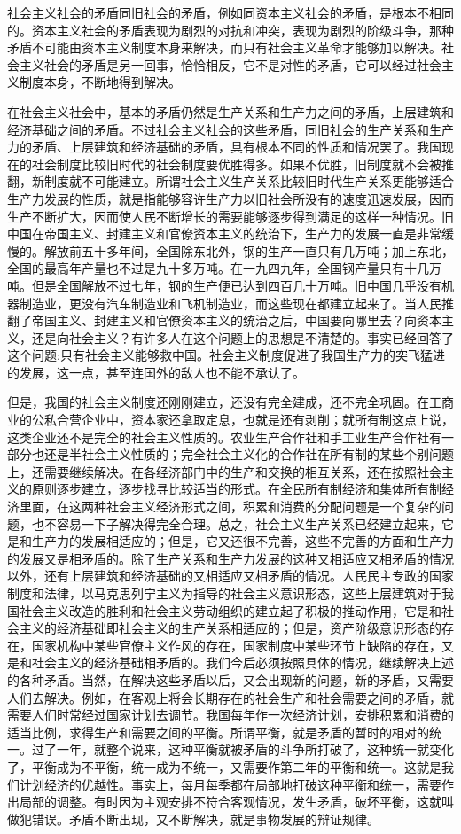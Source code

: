 社会主义社会的矛盾同旧社会的矛盾，例如同资本主义社会的矛盾，是根本不相同的。资本主义社会的矛盾表现为剧烈的对抗和冲突，表现为剧烈的阶级斗争，那种矛盾不可能由资本主义制度本身来解决，而只有社会主义革命才能够加以解决。社会主义社会的矛盾是另一回事，恰恰相反，它不是对性的矛盾，它可以经过社会主义制度本身，不断地得到解决。

在社会主义社会中，基本的矛盾仍然是生产关系和生产力之间的矛盾，上层建筑和经济基础之间的矛盾。不过社会主义社会的这些矛盾，同旧社会的生产关系和生产力的矛盾、上层建筑和经济基础的矛盾，具有根本不同的性质和情况罢了。我国现在的社会制度比较旧时代的社会制度要优胜得多。如果不优胜，旧制度就不会被推翻，新制度就不可能建立。所谓社会主义生产关系比较旧时代生产关系更能够适合生产力发展的性质，就是指能够容许生产力以旧社会所没有的速度迅速发展，因而生产不断扩大，因而使人民不断增长的需要能够逐步得到满足的这样一种情况。旧中国在帝国主义、封建主义和官僚资本主义的统治下，生产力的发展一直是非常缓慢的。解放前五十多年间，全国除东北外，钢的生产一直只有几万吨；加上东北，全国的最高年产量也不过是九十多万吨。在一九四九年，全国钢产量只有十几万吨。但是全国解放不过七年，钢的生产便已达到四百几十万吨。旧中国几乎没有机器制造业，更没有汽车制造业和飞机制造业，而这些现在都建立起来了。当人民推翻了帝国主义、封建主义和官僚资本主义的统治之后，中国要向哪里去？向资本主义，还是向社会主义？有许多人在这个问题上的思想是不清楚的。事实已经回答了这个问题:只有社会主义能够救中国。社会主义制度促进了我国生产力的突飞猛进的发展，这一点，甚至连国外的敌人也不能不承认了。

但是，我国的社会主义制度还刚刚建立，还没有完全建成，还不完全巩固。在工商业的公私合营企业中，资本家还拿取定息，也就是还有剥削；就所有制这点上说，这类企业还不是完全的社会主义性质的。农业生产合作社和手工业生产合作社有一部分也还是半社会主义性质的；完全社会主义化的合作社在所有制的某些个别问题上，还需要继续解决。在各经济部门中的生产和交换的相互关系，还在按照社会主义的原则逐步建立，逐步找寻比较适当的形式。在全民所有制经济和集体所有制经济里面，在这两种社会主义经济形式之间，积累和消费的分配问题是一个复杂的问题，也不容易一下子解决得完全合理。总之，社会主义生产关系已经建立起来，它是和生产力的发展相适应的；但是，它又还很不完善，这些不完善的方面和生产力的发展又是相矛盾的。除了生产关系和生产力发展的这种又相适应又相矛盾的情况以外，还有上层建筑和经济基础的又相适应又相矛盾的情况。人民民主专政的国家制度和法律，以马克思列宁主义为指导的社会主义意识形态，这些上层建筑对于我国社会主义改造的胜利和社会主义劳动组织的建立起了积极的推动作用，它是和社会主义的经济基础即社会主义的生产关系相适应的；但是，资产阶级意识形态的存在，国家机构中某些官僚主义作风的存在，国家制度中某些环节上缺陷的存在，又是和社会主义的经济基础相矛盾的。我们今后必须按照具体的情况，继续解决上述的各种矛盾。当然，在解决这些矛盾以后，又会出现新的问题，新的矛盾，又需要人们去解决。例如，在客观上将会长期存在的社会生产和社会需要之间的矛盾，就需要人们时常经过国家计划去调节。我国每年作一次经济计划，安排积累和消费的适当比例，求得生产和需要之间的平衡。所谓平衡，就是矛盾的暂时的相对的统一。过了一年，就整个说来，这种平衡就被矛盾的斗争所打破了，这种统一就变化了，平衡成为不平衡，统一成为不统一，又需要作第二年的平衡和统一。这就是我们计划经济的优越性。事实上，每月每季都在局部地打破这种平衡和统一，需要作出局部的调整。有时因为主观安排不符合客观情况，发生矛盾，破坏平衡，这就叫做犯错误。矛盾不断出现，又不断解决，就是事物发展的辩证规律。

